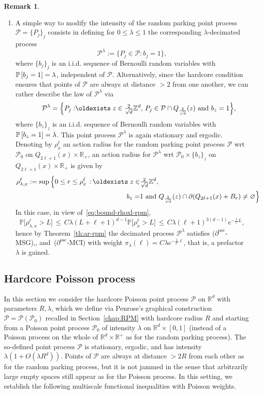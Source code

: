\documentclass[11pt]{article}
\theoremstyle{definition}
\newtheorem{rema}[theo]{Remark}
\numberwithin{equation}{section}
\numberwithin{figure}{section}
\numberwithin{table}{section}
\newcommand{\R}{\mathbb R}
\newcommand{\Z}{\mathbb Z}
\newcommand{\pr}[1]{\mathbb{P}\left[#1 \right]}
\newcommand{\prm}[1]{\mathbb{P}\big[#1 \big]}
\newcommand{\Pc}{\mathcal P}
\newcommand{\osc}{\partial^{\mathrm{osc}}}
\renewcommand*{\exists}{\mathrel{\oldexists}}
\begin{document}
\begin{rema}
\begin{enumerate}
\item \label{rema3.4.2}A simple way to modify the intensity of the random parking point process $\Pc=\{P_j\}_j$ consists in defining for $0\le\lambda \le1$ the corresponding $\lambda$-decimated process
\[
\Pc^\lambda:=\{P_j\in\Pc:b_j=1\},
\]
where $\{b_j\}_j$ is an i.i.d. sequence of Bernoulli random variables with $\pr{b_j=1}\linebreak=\lambda$, independent of $\Pc$. Alternatively, since the hardcore condition ensures that points of $\Pc$ are always at distance $>2$ from one another, we can rather describe the law of $\Pc^\lambda$ via
\[
\qquad\Pc^\lambda=\Big\{P_j:\exists z\in\tfrac2{\sqrt d}\Z^d,\, P_j \in\Pc \cap Q_{\frac2{\sqrt{d}}}(z)\text{ and }b_z=1\Big\},
\]
where $\{b_z\}_z$ is an i.i.d. sequence of Bernoulli random variables with $\pr{b_z=1}\linebreak=\lambda$. This point process $\Pc^\lambda$ is again stationary and ergodic. Denoting by $\rho_x^\ell$ an action radius for the random parking point process $\Pc$ wrt $\Pc_0$ on $Q_{2\ell+1}(x)\times\R_+$, an action radius for $\Pc^\lambda$ wrt $\Pc_0\times\{b_z\}_z$ on $Q_{2\ell+1}(x)\times\R_+$ is given by
\begin{align*}
\rho_{\lambda,x}^\ell := \sup\Big\{0\le r\le \rho_x^\ell \,:\, \exists z\in& \tfrac2{\sqrt d} \Z^d,\\
b_z=&1\text{ and }Q_{\frac2{\sqrt{d}}}(z)\cap\partial(Q_{2\ell+1}(x)+B_r)\ne\varnothing\Big\}
\end{align*}
In this case, in view of~\eqref{eq:bound-rhoxl-rpm},
\[
\prm{\rho_{\lambda,x}^\ell>L}\,\le\,C\lambda(L+\ell+1)^{d-1}\prm{\rho_{x}^\ell>L}\,\le\,C\lambda(\ell+1)^{3(d-1)}e^{-\frac1CL},
\]
hence by Theorem~\ref{th:ar-rpm} the decimated process $\Pc^\lambda$ satisfies {($\osc$-MSG)},\linebreak{($\osc$-MLSI)}, and~{($\osc$-MCI)} with weight $\pi_\lambda(\ell)=C\lambda e^{-\frac1{C}\ell}$, that is, a prefactor $\lambda$ is gained.
\qedhere
\end{enumerate}
\end{rema}


\subsection{Hardcore Poisson process}\label{sec:hardcore}
In this section we consider the hardcore Poisson point process $\Pc$ on $\R^d$ with parameters $R,\lambda$, which we define via Penrose's graphical construction $\Pc=\Pc(\Pc_0)$ recalled in Section~\ref{chap:RPM} with hardcore radius $R$ and starting from a Poisson point process $\Pc_0$ of intensity $\lambda$ on $\R^d\times [0,1]$ (instead of a Poisson process on the whole of $\R^d\times\R^+$ as for the random parking process). The so-defined point process $\Pc$ is stationary, ergodic, and has intensity $\lambda(1+O(\lambda R^d))$. Points of $\Pc$ are always at distance $>2R$ from each other as for the random parking process, but it is not jammed in the sense that arbitrarily large empty spaces still appear as for the Poisson process. In this setting, we establish the following multiscale functional inequalities with Poisson weights.
\end{document}
